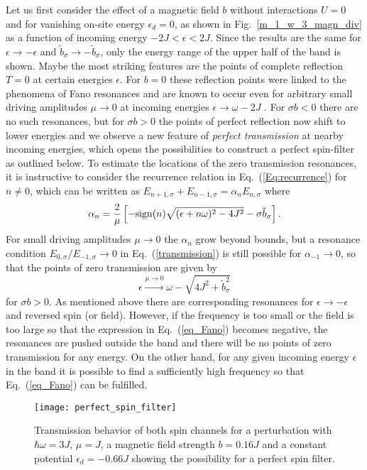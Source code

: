 \documentclass[aps,twocolumn,showpacs,floatfix,prl]{revtex4}
\newcommand{\be}{\begin{equation}}
\newcommand{\ee}{\end{equation}}
\newcommand{\sgn}{{\rm sign}}
\begin{document}
Let us first consider the effect of a magnetic field $b$ without interactions $U=0$ and for
vanishing on-site energy $\epsilon_d=0$, as shown in Fig.~\ref{m_1_w_3_magn_div} as a function
of incoming energy $-2J < \epsilon < 2J$.  
Since the results are the same for $\epsilon \to -\epsilon$ and $\tilde{b}_\sigma \to -\tilde{b}_\sigma$, only the energy range
of the upper half of the band is shown.
Maybe the
most striking features are the points of complete reflection $T=0$ at 
certain energies $\epsilon$.
For $b=0$ these reflection points were linked to the phenomena of Fano resonances and are known to occur even 
for arbitrary small driving amplitudes $\mu \to 0$ at incoming energies   
$\epsilon \to  \omega -2J$ \cite{thuberg2016quantum,reyes2017transport}.   For $\sigma b< 0$ there are no such resonances, but 
for $\sigma b> 0$ the points of perfect reflection now shift
to lower energies and we observe a new
feature of {\it perfect transmission} at nearby incoming energies, which opens the possibilities to construct a 
perfect spin-filter as outlined below.
To estimate the locations of the zero transmission resonances, it is instructive to consider 
the recurrence relation in Eq.~(\ref{Eq:recurrence}) for $n\neq 0$, which can be written as  
$E_{n+1,\sigma} + E_{n-1,\sigma} = \alpha_n E_{n,\sigma}$ where 
\be
\alpha_{n} = \frac{2}{\mu} \left[-\sgn{(n)}\sqrt{(\epsilon+n\omega)^2-4J^2} - \sigma\tilde{b}_{\sigma}\right]. \label{alpha}
\ee
For small driving amplitudes $\mu \to 0$ the $\alpha_n$ grow beyond bounds, but a resonance 
condition $E_{0,\sigma}/E_{-1,\sigma} \to 0$ in Eq.~(\ref{transmission}) is still possible for $\alpha_{-1} \to 0$, so that 
the points of zero transmission are given by
\be
\epsilon \stackrel{\mu\to 0}{\longrightarrow} \omega - \sqrt{4J^2+\tilde{b}_{\sigma}^2}
\label{eq_Fano}
\ee
for $\sigma b > 0$. 
As mentioned above there are corresponding resonances for $\epsilon\to -\epsilon$ and reversed spin (or field).
However,  if the frequency is too small or the field is too large so that the expression in Eq.~(\ref{eq_Fano}) becomes negative, the resonances
are pushed outside the band and there will be no points of zero transmission for any energy.  
On the other hand, for any given incoming energy $\epsilon$ in the band it is possible to find a sufficiently high frequency so that Eq.~(\ref{eq_Fano}) can be
fulfilled.


\begin{figure}[t]
 \centering
\texttt{[image: perfect\_spin\_filter]}
 \caption{Transmission behavior of both spin channels for a perturbation with $\hbar \omega=3J$, $\mu=J$, a magnetic field strength $b=0.16J$ and a constant potential $\epsilon_d=-0.66J$ showing the possibility for a perfect spin filter.}
\label{fig_perfect_spin_filter}
\end{figure} 
\end{document}
